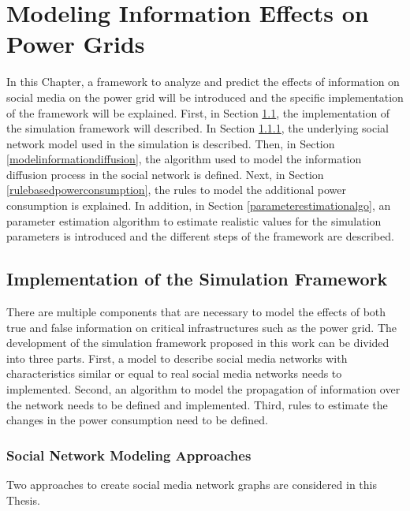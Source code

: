 \chapter{Modeling Information Effects on Power Grids}
\label{implementationall}
In this Chapter, a framework to analyze and predict 
the effects of information on social media on the 
power grid will be introduced and the specific implementation of the 
framework will be explained.
First, in Section \ref{simulationframeworksection}, 
the implementation of the simulation framework will described.
In Section \ref{modelsocialnetwork}, the underlying social network model
used in the simulation is described. Then, in Section 
\ref{modelinformationdiffusion}, the algorithm used to model
the information diffusion process in the social network is 
defined. Next, in Section \ref{rulebasedpowerconsumption}, 
the rules to model the additional power consumption is explained.
In addition, in Section \ref{parameterestimationalgo},
an parameter estimation algorithm to estimate realistic 
values for the simulation parameters is introduced and 
the different steps of the framework are described.

\section{Implementation of the Simulation Framework}
\label{simulationframeworksection}
There are multiple components that are necessary to model the effects of 
both true and false information on critical infrastructures
such as the power grid. The development of the simulation framework
proposed in this work can be divided into three parts. First, a model 
to describe social media networks with characteristics similar 
or equal to real social media networks needs to implemented.
Second, an algorithm to model the 
propagation of information over the network needs to be defined and 
implemented. Third, rules to estimate the changes in the power consumption 
need to be defined.

\subsection{Social Network Modeling Approaches}
\label{modelsocialnetwork}
Two approaches to create social media network graphs 
are considered in this Thesis.

